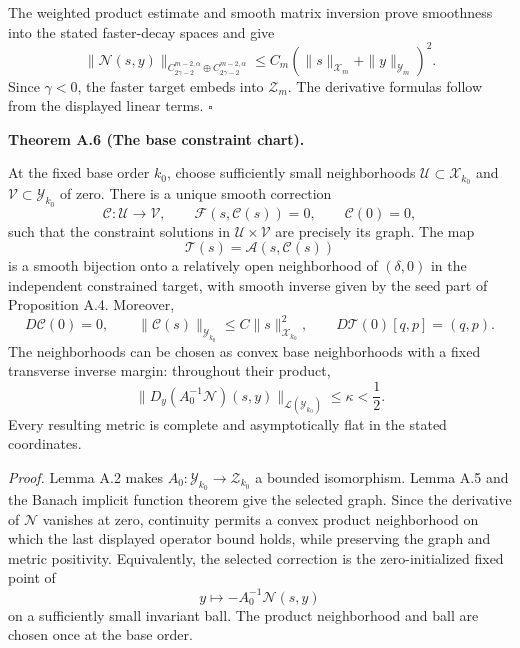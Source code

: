 \documentclass[
  english,
  11pt,
  reqno]{amsart}
\makeatletter
\newcommand{\pandocstatementheading}[1]{%
  \par\if@nobreak\else
    \addpenalty{\@beginparpenalty}%
    \addvspace{.5\baselineskip plus .2\baselineskip minus .2\baselineskip}%
  \fi
  {\normalfont\bfseries #1\par}%
  \nobreak\@afterindenttrue\@afterheading
}
\makeatother
\begin{document}
The weighted product estimate and smooth matrix inversion prove
smoothness into the stated faster-decay spaces and give \[
\|\mathcal N(s,y)\|_{C^{m-2,\alpha}_{2\gamma-2}
\oplus C^{m-2,\alpha}_{2\gamma-2}}
\le C_m(\|s\|_{\mathcal X_m}+\|y\|_{\mathcal Y_m})^2.
\] Since \(\gamma<0\), the faster target embeds into \(\mathcal Z_m\).
The derivative formulas follow from the displayed linear terms.
\hfill\(\square\)

\pandocstatementheading{\leavevmode{}\label{thm:online-chart-base-constraint-bijection}Theorem A.6 (The base constraint chart).}

At the fixed base order \(k_0\), choose sufficiently small neighborhoods
\(\mathcal U\subset\mathcal X_{k_0}\) and
\(\mathcal V\subset\mathcal Y_{k_0}\) of zero. There is a unique smooth
correction%
 \[
\mathcal C:\mathcal U\longrightarrow\mathcal V,\qquad
\mathcal F(s,\mathcal C(s))=0,\qquad
\mathcal C(0)=0,
\] such that the constraint solutions in \(\mathcal U\times\mathcal V\)
are precisely its graph. The map%
 \[
\mathcal T(s)=\mathcal A(s,\mathcal C(s))
\] is a smooth bijection onto a relatively open neighborhood of
\((\delta,0)\) in the independent constrained target, with smooth
inverse given by the seed part of Proposition A.4. Moreover,%
 \[
D\mathcal C(0)=0,\qquad
\|\mathcal C(s)\|_{\mathcal Y_{k_0}}
\le C\|s\|_{\mathcal X_{k_0}}^2,
\qquad D\mathcal T(0)[q,p]=(q,p).
\] The neighborhoods can be chosen as convex base neighborhoods with a
fixed transverse inverse margin: throughout their product,%
 \[
\|D_y(A_0^{-1}\mathcal N)(s,y)\|
_{\mathcal L(\mathcal Y_{k_0})}\le\kappa<\frac12.
\] Every resulting metric is complete and asymptotically flat in the
stated coordinates.

\emph{Proof.} Lemma A.2 makes
\(A_0:\mathcal Y_{k_0}\to\mathcal Z_{k_0}\) a bounded isomorphism. Lemma
A.5 and the Banach implicit function theorem give the selected graph.
Since the derivative of \(\mathcal N\) vanishes at zero, continuity
permits a convex product neighborhood on which the last displayed
operator bound holds, while preserving the graph and metric positivity.
Equivalently, the selected correction is the zero-initialized fixed
point of \[
y\longmapsto-A_0^{-1}\mathcal N(s,y)
\] on a sufficiently small invariant ball. The product neighborhood and
ball are chosen once at the base order.
\end{document}
